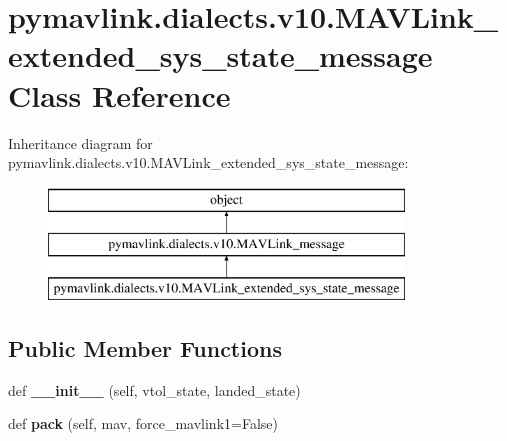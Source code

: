 \hypertarget{classpymavlink_1_1dialects_1_1v10_1_1MAVLink__extended__sys__state__message}{}\section{pymavlink.\+dialects.\+v10.\+M\+A\+V\+Link\+\_\+extended\+\_\+sys\+\_\+state\+\_\+message Class Reference}
\label{classpymavlink_1_1dialects_1_1v10_1_1MAVLink__extended__sys__state__message}
Inheritance diagram for pymavlink.\+dialects.\+v10.\+M\+A\+V\+Link\+\_\+extended\+\_\+sys\+\_\+state\+\_\+message\+:\begin{figure}[H]
\begin{center}
\leavevmode
\includegraphics[height=3.000000cm]{classpymavlink_1_1dialects_1_1v10_1_1MAVLink__extended__sys__state__message}
\end{center}
\end{figure}
\subsection*{Public Member Functions}
\begin{DoxyCompactItemize}
\item 
\mbox{\label{classpymavlink_1_1dialects_1_1v10_1_1MAVLink__extended__sys__state__message_a785f1a9131f39aa3670e111a913fbc35}} 
def {\bfseries \+\_\+\+\_\+init\+\_\+\+\_\+} (self, vtol\+\_\+state, landed\+\_\+state)
\item 
\mbox{\label{classpymavlink_1_1dialects_1_1v10_1_1MAVLink__extended__sys__state__message_a30d519d4aeea93d83160a8e96f302839}} 
def {\bfseries pack} (self, mav, force\+\_\+mavlink1=False)
\end{DoxyCompactItemize}
